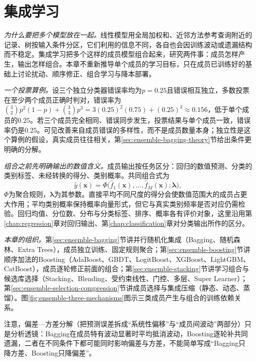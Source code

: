 \chapter{集成学习}
\label{chap:ensemble-learning}

\emph{为什么要把多个模型放在一起。}线性模型用全局加权和、近邻方法参考查询附近的记录、树按输入条件分区，它们利用的信息不同，各自也会因训练波动或遗漏结构而不稳定。集成学习把多个这样的成员模型组合起来，研究两件事：成员怎样产生，输出怎样组合。本章不重新推导单个成员的学习目标，只在成员已训练好的基础上讨论扰动、顺序修正、组合学习与降本部署。

\emph{一个投票算例。}设三个独立分类器错误率均为$p=0.25$且错误相互独立，多数投票在至少两个成员正确时判对，错误率为$\binom32p^2(1-p)+\binom33p^3=3(0.25)^2(0.75)+(0.25)^3\approx0.156$，低于单个成员的$0.25$。若三个成员完全相同、错误同步发生，投票结果与单个成员一致，错误率仍是$0.25$。可见改善来自成员错误的多样性，而不是成员数量本身；独立性是这个算例的假设，真实成员往往相关，第\ref{sec:ensemble-bagging-theory}节给出条件更明确的分解。

\emph{组合之前先明确输出的数值含义。}成员输出按任务区分：回归的数值预测、分类的类别标签、未经转换的得分、类别概率。共同组合式为
\begin{equation}
  \hat y(\bm x)=\Phi\big(\hat f_1(\bm x),\ldots,\hat f_M(\bm x);\bm\lambda\big),
  \label{eq:ensemble-combination}
\end{equation}
$\Phi$为聚合规则，$\bm\lambda$为其参数。直接平均不同尺度的得分会使数值范围大的成员占更大作用；平均类别概率保持概率向量形式，但它与真实类别频率是否对应仍需检验。回归均值、分位数、分布与分类标签、排序、概率各有评价对象，这里沿用第\ref{chap:regression}章对回归输出、第\ref{chap:classification}章对分类输出所作的区分。

\emph{本章的组织。}第\ref{sec:ensemble-bagging}节讲并行随机化集成（Bagging、随机森林、Extra Trees），成员独立训练、固定规则聚合；第\ref{sec:ensemble-boosting}节讲顺序加法的Boosting（AdaBoost、GBDT、LogitBoost、XGBoost、LightGBM、CatBoost），成员逐轮修正前面的组合；第\ref{sec:ensemble-stacking}节讲学习组合与候选库选择（Stacking、Blending、受约束线性、门控、多层、Super Learner）；第\ref{sec:ensemble-selection-compression}节讲成员选择与集成压缩（静态、动态、蒸馏）。图\ref{fig:ensemble-three-mechanisms}图示三类成员产生与组合的训练依赖关系。

注意，偏差—方差分解（把预测误差拆成“系统性偏移”与“成员间波动”两部分）只是分析透镜：Bagging在成员特有波动显著时平均抵消波动，Boosting逐轮补共同遗漏，二者在不同条件下都可能同时影响偏差与方差，不能简单写成“Bagging只降方差、Boosting只降偏差”。


